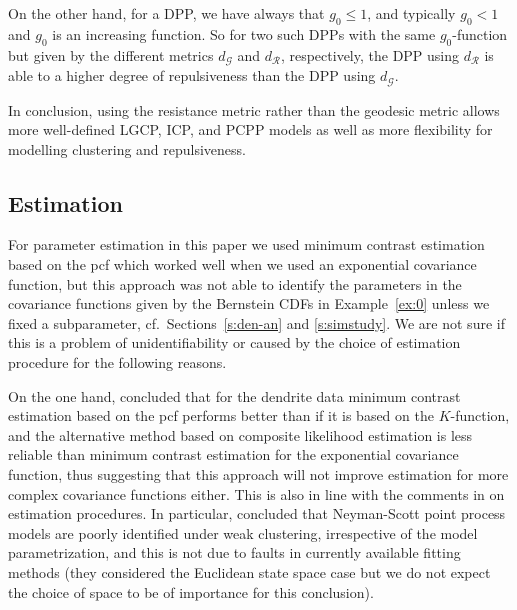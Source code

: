 \documentclass[alpha-refs]{wiley-article}
\begin{document}
On the other hand, for a DPP, we have always that $g_0\le 1$, and typically $g_0< 1$ and $g_0$ is an increasing function. So for two such DPPs with the same $g_0$-function but given by the different metrics $d_{\mathcal G}$ and $d_{\mathcal R}$, respectively, the DPP using $d_{\mathcal R}$ is able to a higher degree of repulsiveness than the DPP using $d_{\mathcal G}$. 

In conclusion, using the resistance metric rather than the geodesic metric allows more well-defined LGCP, ICP, and PCPP models as well as more
flexibility for modelling clustering and repulsiveness. 

\subsection{Estimation}\label{s:7.3}


For parameter estimation in this paper we used minimum contrast estimation based on the pcf which worked well when we used an exponential covariance function, but this approach was not able to identify the parameters in the covariance functions given by the Bernstein CDFs in Example~\ref{ex:0} unless we fixed a subparameter, cf.\ Sections~\ref{s:den-an} and \ref{s:simstudy}. We are not sure if this is a problem of unidentifiability or caused by the choice of estimation procedure for the following reasons. 

On the one hand,
\cite{HeidiMe} concluded that for the dendrite data minimum contrast estimation based on the pcf performs better than if it is based on the $K$-function, and the alternative method based on  composite likelihood estimation is less reliable than minimum contrast estimation for the exponential covariance function, thus suggesting that this approach will not improve estimation for more complex covariance functions either.
This is also in line with the comments in \citet{BadEtAl2022} on estimation procedures. 
In particular, \citet[][Section 12]{BadEtAl2022} concluded that Neyman-Scott point process models are poorly identified under weak clustering, irrespective of the model parametrization, and this is not due to faults in currently available fitting
methods (they considered the Euclidean state space case but we do not expect the choice of space to be of importance for this conclusion).
\end{document}
